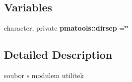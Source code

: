 \subsection*{Variables}
\begin{DoxyCompactItemize}
\item 
character, private {\bf pmatools\+::dirsep} =\char`\"{}\char`\"{}
\end{DoxyCompactItemize}


\subsection{Detailed Description}
soubor s modulem utilitek 

